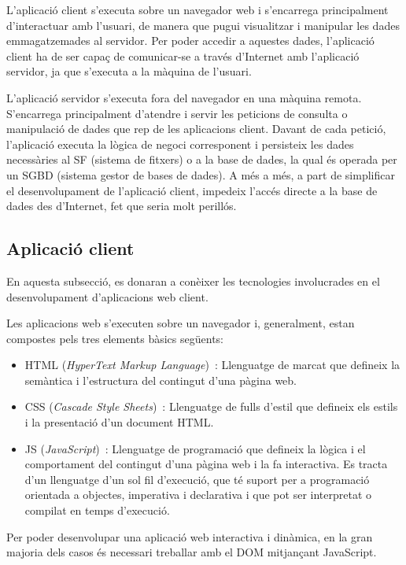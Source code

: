 \documentclass[a4paper,12pt]{ThesisStyle}
\begin{document}
L'aplicació client s'executa sobre un navegador web i s'encarrega principalment d'interactuar amb l'usuari, de manera que pugui visualitzar i manipular les dades emmagatzemades al servidor. Per poder accedir a aquestes dades, l'aplicació client ha de ser capaç de comunicar-se a través d'Internet amb l'aplicació servidor, ja que s'executa a la màquina de l'usuari.

L'aplicació servidor s'executa fora del navegador en una màquina remota. S'encarrega principalment d'atendre i servir les peticions de consulta o manipulació de dades que rep de les aplicacions client. Davant de cada petició, l'aplicació executa la lògica de negoci corresponent i persisteix les dades necessàries al SF (sistema de fitxers) o a la base de dades, la qual és operada per un SGBD (sistema gestor de bases de dades). A més a més, a part de simplificar el desenvolupament de l'aplicació client, impedeix l'accés directe a la base de dades des d'Internet, fet que seria molt perillós.

\subsection{Aplicació client}

En aquesta subsecció, es donaran a conèixer les tecnologies involucrades en el desenvolupament d'aplicacions web client.

Les aplicacions web s'executen sobre un navegador i, generalment, estan compostes pels tres elements bàsics següents:
\begin{itemize}
  \item HTML (\textit{HyperText Markup Language})~\cite{HTML}: Llenguatge de marcat que defineix la semàntica i l'estructura del contingut d'una pàgina web.
  \item CSS (\textit{Cascade Style Sheets})~\cite{CSS}: Llenguatge de fulls d'estil que defineix els estils i la presentació d'un document HTML.
  \item JS (\textit{JavaScript})~\cite{JS}: Llenguatge de programació que defineix la lògica i el comportament del contingut d'una pàgina web i la fa interactiva. Es tracta d'un llenguatge d'un sol fil d'execució, que té suport per a programació orientada a objectes, imperativa i declarativa i que pot ser interpretat o compilat en temps d'execució.
\end{itemize}

Per poder desenvolupar una aplicació web interactiva i dinàmica, en la gran majoria dels casos és necessari treballar amb el DOM mitjançant JavaScript.
\end{document}

